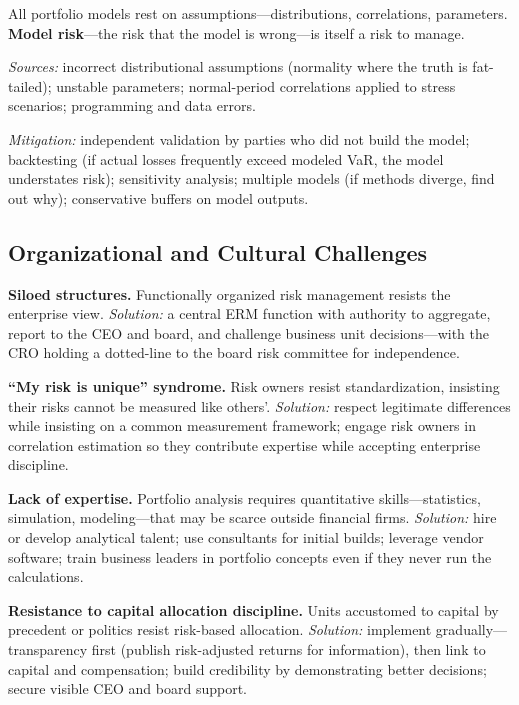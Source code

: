 \documentclass[11pt,openany]{book}
\begin{document}
All portfolio models rest on assumptions---distributions, correlations,
parameters. \textbf{Model risk}---the risk that the model is wrong---is itself
a risk to manage.

\emph{Sources:} incorrect distributional assumptions (normality where the
truth is fat-tailed); unstable parameters; normal-period correlations applied
to stress scenarios; programming and data errors.

\emph{Mitigation:} independent validation by parties who did not build the
model; backtesting (if actual losses frequently exceed modeled VaR, the model
understates risk); sensitivity analysis; multiple models (if methods diverge,
find out why); conservative buffers on model outputs.

\subsection{Organizational and Cultural Challenges}
\label{subsec:organizational-challenges}

\textbf{Siloed structures.} Functionally organized risk management resists the
enterprise view. \emph{Solution:} a central ERM function with authority to
aggregate, report to the CEO and board, and challenge business unit
decisions---with the CRO holding a dotted-line to the board risk committee for
independence.

\textbf{``My risk is unique'' syndrome.} Risk owners resist standardization,
insisting their risks cannot be measured like others'. \emph{Solution:}
respect legitimate differences while insisting on a common measurement
framework; engage risk owners in correlation estimation so they contribute
expertise while accepting enterprise discipline.

\textbf{Lack of expertise.} Portfolio analysis requires quantitative
skills---statistics, simulation, modeling---that may be scarce outside
financial firms. \emph{Solution:} hire or develop analytical talent; use
consultants for initial builds; leverage vendor software; train business
leaders in portfolio concepts even if they never run the calculations.

\textbf{Resistance to capital allocation discipline.} Units accustomed to
capital by precedent or politics resist risk-based allocation.
\emph{Solution:} implement gradually---transparency first (publish
risk-adjusted returns for information), then link to capital and compensation;
build credibility by demonstrating better decisions; secure visible CEO and
board support.
\end{document}
